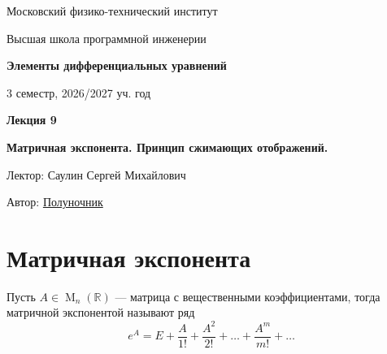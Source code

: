 \documentclass[11pt]{article}
\DeclareMathOperator{\M}{M}
\newcommand{\lectureNumber}{9}
\newcommand{\lectureTitle}{Матричная экспонента. Принцип сжимающих отображений. }
\newcommand{\courseName}{Элементы дифференциальных уравнений}
\newcommand{\semester}{3 семестр, 2026/2027 уч. год}
\begin{document}
\begin{titlepage}
    \centering
    
    {\large Московский физико-технический институт \par}
    {\large Высшая школа программной инженерии \par}
    \vspace{2cm}

    {\Large \textbf{\courseName} \par}
    {\large \semester \par}
    
    \vspace*{\fill}

    {\Huge \textbf{Лекция \lectureNumber} \par}
    {\Huge \textbf{\lectureTitle} \par}
    
    \vspace*{\fill}
    
    {\large Лектор: Саулин Сергей Михайлович \par}
    {\large Автор: \href{https://t.me/lost_luna}{Полуночник} \par}

\end{titlepage}


\section{Матричная экспонента}

\begin{definition}
    Пусть $A \in \M_n(\mathbb{R})$ --- матрица с вещественными коэффициентами, тогда матричной экспонентой называют ряд \[e^A = E + \frac{A}{1!} + 
    \frac{A^2}{2!} + \dots + \frac{A^m}{m!} + \dots\]
\end{definition}
\end{document}
